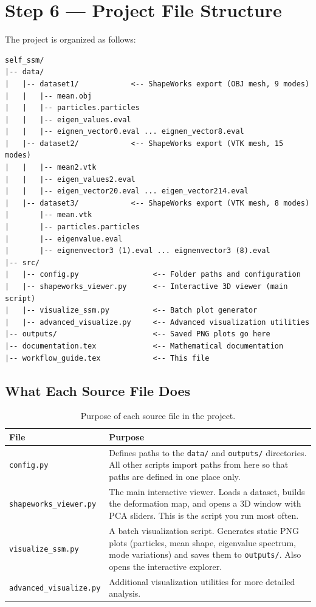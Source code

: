 \documentclass[12pt,a4paper]{article}
\begin{document}
\section{Step 6 --- Project File Structure}

The project is organized as follows:

\begin{lstlisting}[title={\textbf{Project directory tree}}]
self_ssm/
|-- data/
|   |-- dataset1/            <-- ShapeWorks export (OBJ mesh, 9 modes)
|   |   |-- mean.obj
|   |   |-- particles.particles
|   |   |-- eigen_values.eval
|   |   |-- eignen_vector0.eval ... eignen_vector8.eval
|   |-- dataset2/            <-- ShapeWorks export (VTK mesh, 15 modes)
|   |   |-- mean2.vtk
|   |   |-- eigen_values2.eval
|   |   |-- eigen_vector20.eval ... eigen_vector214.eval
|   |-- dataset3/            <-- ShapeWorks export (VTK mesh, 8 modes)
|       |-- mean.vtk
|       |-- particles.particles
|       |-- eigenvalue.eval
|       |-- eignenvector3 (1).eval ... eignenvector3 (8).eval
|-- src/
|   |-- config.py                 <-- Folder paths and configuration
|   |-- shapeworks_viewer.py      <-- Interactive 3D viewer (main script)
|   |-- visualize_ssm.py          <-- Batch plot generator
|   |-- advanced_visualize.py     <-- Advanced visualization utilities
|-- outputs/                      <-- Saved PNG plots go here
|-- documentation.tex             <-- Mathematical documentation
|-- workflow_guide.tex            <-- This file
\end{lstlisting}

\subsection{What Each Source File Does}

\begin{table}[H]
\centering
\renewcommand{\arraystretch}{1.4}
\begin{tabular}{@{}lp{10cm}@{}}
\toprule
\textbf{File} & \textbf{Purpose} \\
\midrule
\texttt{config.py} & Defines paths to the \texttt{data/} and \texttt{outputs/} directories. All other scripts import paths from here so that paths are defined in one place only. \\
\texttt{shapeworks\_viewer.py} & The main interactive viewer. Loads a dataset, builds the deformation map, and opens a 3D window with PCA sliders. This is the script you run most often. \\
\texttt{visualize\_ssm.py} & A batch visualization script. Generates static PNG plots (particles, mean shape, eigenvalue spectrum, mode variations) and saves them to \texttt{outputs/}. Also opens the interactive explorer. \\
\texttt{advanced\_visualize.py} & Additional visualization utilities for more detailed analysis. \\
\bottomrule
\end{tabular}
\caption{Purpose of each source file in the project.}
\label{tab:source_files}
\end{table}
\end{document}
